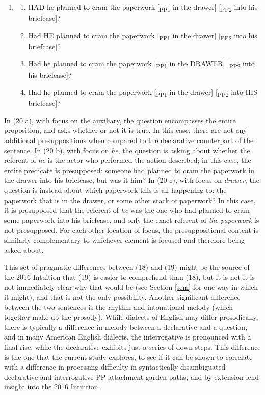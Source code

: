 \documentclass[11pt,oneside]{book}
\providecommand{\tightlist}{%
  \setlength{\itemsep}{0pt}\setlength{\parskip}{0pt}}
\begin{document}
\begin{enumerate}
\def\labelenumi{(\arabic{enumi})}
\setcounter{enumi}{19}
\item
  \begin{enumerate}
  \def\labelenumii{\alph{enumii}.}
  \tightlist
  \item
    HAD he planned to cram the paperwork {[}\textsubscript{PP1} in the drawer{]} {[}\textsubscript{PP2} into his briefcase{]}?
  \item
    Had HE planned to cram the paperwork {[}\textsubscript{PP1} in the drawer{]} {[}\textsubscript{PP2} into his briefcase{]}?
  \item
    Had he planned to cram the paperwork {[}\textsubscript{PP1} in the DRAWER{]} {[}\textsubscript{PP2} into his briefcase{]}?
  \item
    Had he planned to cram the paperwork {[}\textsubscript{PP1} in the drawer{]} {[}\textsubscript{PP2} into HIS briefcase{]}?
  \end{enumerate}
\end{enumerate}

In (20 a), with focus on the auxiliary, the question encompasses the entire proposition, and asks whether or not it is true. In this case, there are not any additional presuppositions when compared to the declarative counterpart of the sentence. In (20 b), with focus on \emph{he}, the question is asking about whether the referent of \emph{he} is the actor who performed the action described; in this case, the entire predicate is presupposed: someone had planned to cram the paperwork in the drawer into his briefcase, but was it him? In (20 c), with focus on \emph{drawer}, the question is instead about which paperwork this is all happening to: the paperwork that is in the drawer, or some other stack of paperwork? In this case, it is presupposed that the referent of \emph{he} was the one who had planned to cram some paperwork into his briefcase, and only the exact referent of \emph{the paperwork} is not presupposed. For each other location of focus, the presuppositional content is similarly complementary to whichever element is focused and therefore being asked about.

This set of pragmatic differences between (18) and (19) might be the source of the 2016 Intuition that (19) is easier to comprehend than (18), but it is not it is not immediately clear why that would be (see Section \ref{sem} for one way in which it might), and that is not the only possibility. Another significant difference between the two sentences is the rhythm and intonational melody (which together make up the prosody). While dialects of English may differ prosodically, there is typically a difference in melody between a declarative and a question, and in many American English dialects, the interrogative is pronounced with a final rise, while the declarative exhibits just a series of down-steps. This difference is the one that the current study explores, to see if it can be shown to correlate with a difference in processing difficulty in syntactically disambiguated declarative and interrogative PP-attachment garden paths, and by extension lend insight into the 2016 Intuition.
\end{document}
